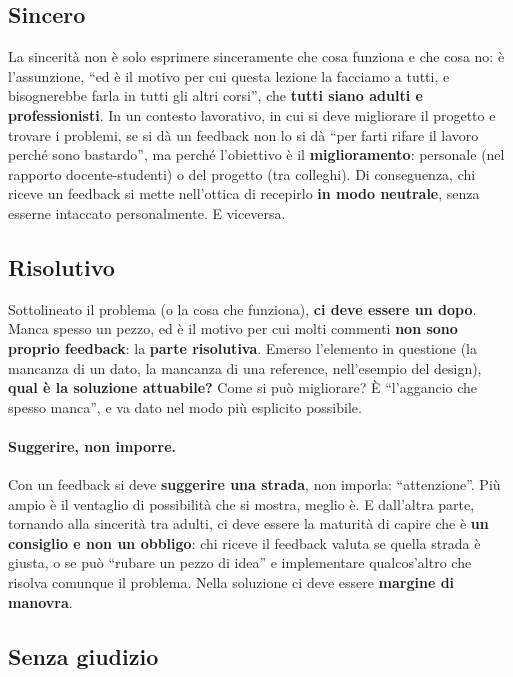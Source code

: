 \subsection{Sincero}

La sincerità non è solo esprimere sinceramente che cosa funziona e che cosa
no: è l'assunzione, ``ed è il motivo per cui questa lezione la facciamo a
tutti, e bisognerebbe farla in tutti gli altri corsi'', che \textbf{tutti
siano adulti e professionisti}. In un contesto lavorativo, in cui si deve
migliorare il progetto e trovare i problemi, se si dà un feedback non lo si
dà ``per farti rifare il lavoro perché sono bastardo'', ma perché
l'obiettivo è il \textbf{miglioramento}: personale (nel rapporto
docente-studenti) o del progetto (tra colleghi). Di conseguenza, chi riceve
un feedback si mette nell'ottica di recepirlo \textbf{in modo neutrale},
senza esserne intaccato personalmente. E viceversa.

\subsection{Risolutivo}

Sottolineato il problema (o la cosa che funziona), \textbf{ci deve essere un
dopo}. Manca spesso un pezzo, ed è il motivo per cui molti commenti
\textbf{non sono proprio feedback}: la \textbf{parte risolutiva}. Emerso
l'elemento in questione (la mancanza di un dato, la mancanza di una
reference, nell'esempio del design), \textbf{qual è la soluzione attuabile?}
Come si può migliorare? È ``l'aggancio che spesso manca'', e va dato nel
modo più esplicito possibile.

\paragraph{Suggerire, non imporre.} Con un feedback si deve
\textbf{suggerire una strada}, non imporla: ``attenzione''. Più ampio è il
ventaglio di possibilità che si mostra, meglio è. E dall'altra parte,
tornando alla sincerità tra adulti, ci deve essere la maturità di capire che
è \textbf{un consiglio e non un obbligo}: chi riceve il feedback valuta se
quella strada è giusta, o se può ``rubare un pezzo di idea'' e implementare
qualcos'altro che risolva comunque il problema. Nella soluzione ci deve
essere \textbf{margine di manovra}.

\subsection{Senza giudizio}

